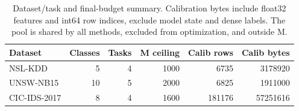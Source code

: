 \begin{table}[t]
\centering\scriptsize
\setlength{\tabcolsep}{3.8pt}
\caption{Dataset/task and final-budget summary. Calibration bytes include float32 features and int64 row indices, exclude model state and dense labels. The pool is shared by all methods, excluded from optimization, and outside M.}\label{tab:protocol}
\begin{tabular}{lrrrrr}
\toprule
Dataset & Classes & Tasks & M ceiling & Calib rows & Calib bytes \\
\midrule
NSL-KDD & 5 & 4 & 1000 & 6735 & 3178920 \\
UNSW-NB15 & 10 & 5 & 2000 & 6825 & 1911000 \\
CIC-IDS-2017 & 8 & 4 & 1600 & 181176 & 57251616 \\
\bottomrule
\end{tabular}
\end{table}
